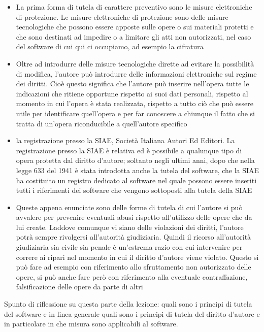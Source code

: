 \begin{itemize}
    \item La prima forma di tutela di carattere preventivo sono le misure elettroniche di protezione. Le misure elettroniche di protezione sono delle misure tecnologiche che possono essere apposte sulle opere o sui materiali protetti e che sono destinati ad impedire o a limitare gli atti non autorizzati, nel caso del software di cui qui ci occupiamo, ad esempio la cifratura
    \item Oltre ad introdurre delle misure tecnologiche dirette ad evitare la possibilità di modifica, l'autore può introdurre delle informazioni elettroniche sul regime dei diritti. Cioè questo significa che l'autore può inserire nell'opera tutte le indicazioni che ritiene opportune rispetto ai suoi dati personali, rispetto al momento in cui l'opera è stata realizzata, rispetto a tutto ciò che può essere utile per identificare quell'opera e per far conoscere a chiunque il fatto che si tratta di un'opera riconducibile a quell'autore specifico
    \item la registrazione presso la SIAE, Società Italiana Autori Ed Editori. La registrazione presso la SIAE è relativa ed è possibile a qualunque tipo di opera protetta dal diritto d'autore; soltanto negli ultimi anni, dopo che nella legge 633 del 1941 è stata introdotta anche la tutela del software, che la SIAE ha costituito un registro dedicato al software nel quale possono essere inseriti tutti i riferimenti dei software che vengono sottoposti alla tutela della SIAE
    \item Queste appena enunciate sono delle forme di tutela di cui l'autore si può avvalere per prevenire eventuali abusi rispetto all'utilizzo delle opere che da lui create. Laddove comunque vi siano delle violazioni dei diritti, l'autore potrà sempre rivolgersi all'autorità giudiziaria. Quindi il ricorso all'autorità giudiziaria sia civile sia penale è un'estrema razio con cui intervenire per correre ai ripari nel momento in cui il diritto d'autore viene violato. Questo si può fare ad esempio con riferimento allo sfruttamento non autorizzato delle opere, si può anche fare però con riferimento alla eventuale contraffazione, falsificazione delle opere da parte di altri
\end{itemize}

Spunto di riflessione su questa parte della lezione: quali sono i principi di tutela del software e in linea generale quali sono i principi di tutela del diritto d'autore e in particolare in che misura sono applicabili al software. 



